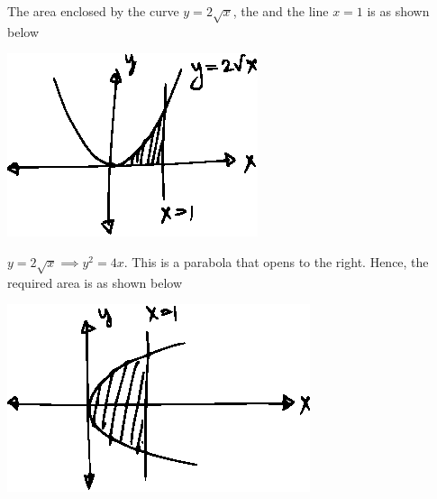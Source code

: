 \documentclass[14pt,fleqn]{extarticle}
\begin{document}
\begin{snippet}
    
    \incorrect
    
    The area enclosed by the curve $y=2\sqrt{x}$, the \xaxis and the line $x=1$ is as shown below 
    
    \begin{center}
\includegraphics[scale=1.4]{wrong.eps}
\end{center} 
    
    \reason
    
    $y=2\sqrt{x}\implies y^2 = 4x$. This is a parabola that opens to the right.
    Hence, the required area is as shown below 
    
    \begin{center}
\includegraphics[scale=1.4]{right.eps}
\end{center}
\end{snippet} 
\end{document}
